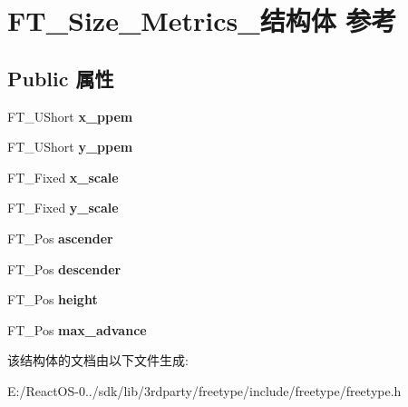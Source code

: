 \hypertarget{struct_f_t___size___metrics__}{}\section{F\+T\+\_\+\+Size\+\_\+\+Metrics\+\_\+结构体 参考}
\label{struct_f_t___size___metrics__}
\subsection*{Public 属性}
\begin{DoxyCompactItemize}
\item 
\mbox{\label{struct_f_t___size___metrics___abb42b175a3450e9d8b84483f166d6c8a}} 
F\+T\+\_\+\+U\+Short {\bfseries x\+\_\+ppem}
\item 
\mbox{\label{struct_f_t___size___metrics___abcdb70cb9e39a74679bc39c07f3275f7}} 
F\+T\+\_\+\+U\+Short {\bfseries y\+\_\+ppem}
\item 
\mbox{\label{struct_f_t___size___metrics___a5e92028bb9881e107a6fb75d557eaff1}} 
F\+T\+\_\+\+Fixed {\bfseries x\+\_\+scale}
\item 
\mbox{\label{struct_f_t___size___metrics___a1f8b1cb3538b9920127f721dd061379d}} 
F\+T\+\_\+\+Fixed {\bfseries y\+\_\+scale}
\item 
\mbox{\label{struct_f_t___size___metrics___ab5fde60a2661d7b774f61c264a2a6070}} 
F\+T\+\_\+\+Pos {\bfseries ascender}
\item 
\mbox{\label{struct_f_t___size___metrics___a9b2ca3a4391803e8721ed99eb9953d52}} 
F\+T\+\_\+\+Pos {\bfseries descender}
\item 
\mbox{\label{struct_f_t___size___metrics___ae3361e264fb8a9e669f118bdb244439b}} 
F\+T\+\_\+\+Pos {\bfseries height}
\item 
\mbox{\label{struct_f_t___size___metrics___ac315a7a834ac1a57c7169ce021718958}} 
F\+T\+\_\+\+Pos {\bfseries max\+\_\+advance}
\end{DoxyCompactItemize}


该结构体的文档由以下文件生成\+:\begin{DoxyCompactItemize}
\item 
E\+:/\+React\+O\+S-\/0../sdk/lib/3rdparty/freetype/include/freetype/freetype.\+h\end{DoxyCompactItemize}
